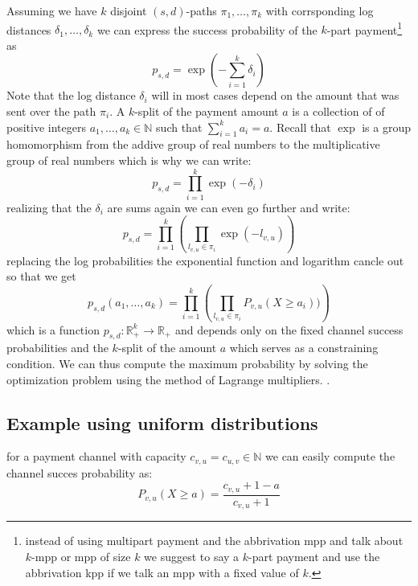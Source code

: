 \documentclass[10pt,twocolumn]{article}
\begin{document}
Assuming we have $k$ disjoint $(s,d)$-paths $\pi_1,\dots,\pi_k$ with corrsponding log distances $\delta_1,\dots,\delta_k$ we can express the success probability of the $k$-part payment\footnote{instead of using multipart payment and the abbrivation mpp and talk about $k$-mpp or mpp of size $k$ we suggest to say a $k$-part payment and use the abbrivation kpp if we talk an mpp with a fixed value of $k$.} as
\[
p_{s,d} = \exp\left(-\sum_{i=1}^k\delta_i\right)
\]
Note that the log distance $\delta_i$ will in most cases depend on the amount that was sent over the path $\pi_i$.
A $k$-split of the payment amount $a$ is a collection of of positive integers $a_1,\dots,a_k \in \mathbb{N}$ such that $\sum_{i=1}^ka_i=a$.
Recall that $\exp$ is a group homomorphism from the addive group of real numbers to the multiplicative group of real numbers which is why we can write: 
\[
p_{s,d} = \prod_{i=1}^k\exp(-\delta_i)
\]
realizing that the $\delta_i$ are sums again we can even go further and write:
\[
p_{s,d} = \prod_{i=1}^k\left(\prod_{l_{v,u}\in\pi_i}\exp(-l_{v,u})\right)
\]
replacing the log probabilities the exponential function and logarithm cancle out so that we get
\[
p_{s,d}(a_1,\dots,a_k) = \prod_{i=1}^k\left(\prod_{l_{v,u}\in\pi_i}P_{v,u}(X\geq a_i))\right)
\]
which is a function $p_{s,d}:\mathbb{R}^k_+\longrightarrow\mathbb{R}_+$ and depends only on the fixed channel success probabilities and the $k$-split of the amount $a$ which serves as a constraining condition.
We can thus compute the maximum probability by solving the optimization problem using the method of Lagrange multipliers.
.
\subsection{Example using uniform distributions}
for a payment channel with capacity $c_{v,u}=c_{u,v}\in\mathbb{N}$ we can easily compute the channel succes probability as:
\[
P_{v,u}(X\geq a)=\frac{c_{v,u}+1 - a}{c_{v,u}+1}
\]
\end{document}
